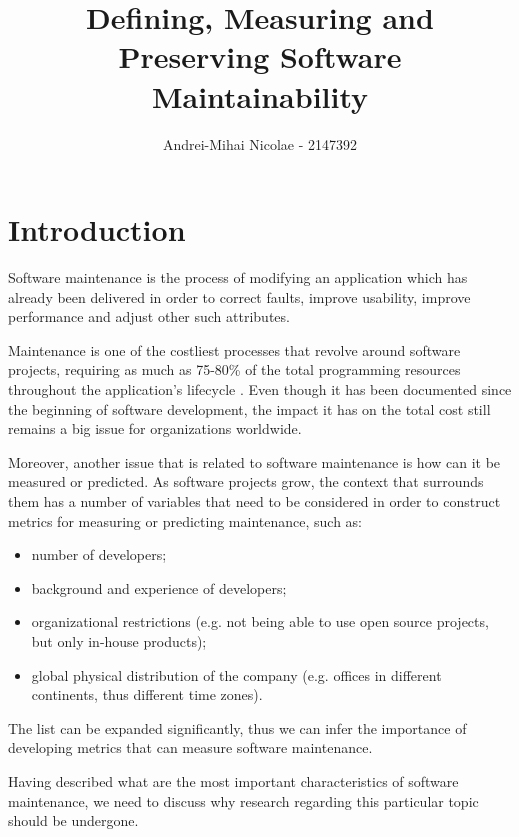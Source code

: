 \documentclass[a4paper,portrait,12pt]{article}
\author{Andrei-Mihai Nicolae - 2147392}
\title{Defining, Measuring and Preserving Software Maintainability }
\begin{document}
\setlength{\oddsidemargin}{0.9847in-1in}
\setlength{\textwidth}{\paperwidth - 0.9847in-0.9847in}
  
\maketitle

 \section{Introduction}
  
  Software maintenance is the process of modifying an application which has
  already been delivered in order to correct faults, improve usability,
  improve performance and adjust other such attributes\citep{iee1990ieee}. 
 
  Maintenance is one of the costliest processes that revolve around 
  software projects, requiring as much as 75-80\% of the total programming 
  resources throughout the application's lifecycle
  \citep{lientz1978characteristics}. Even though it has been documented 
  since the beginning of software development, the impact it has on the
  total cost still remains a big issue for organizations worldwide. 

  Moreover, another issue that is related to software maintenance is how 
  can it be measured or predicted. As software projects grow, the context that 
  surrounds them has a number of variables that need to be considered in order 
  to construct metrics for measuring or predicting maintenance, such as:
    \begin{itemize}
      \item number of developers;
      \item background and experience of developers;
      \item organizational restrictions (e.g. not being able to use open 
      source projects, but only in-house products);
      \item global physical distribution of the company (e.g. offices in
      different continents, thus different time zones).
    \end{itemize}
  The list can be expanded significantly, thus we can infer the importance 
  of developing metrics that can measure software maintenance.

  Having described what are the most important characteristics of software
  maintenance, we need to discuss why research regarding this particular
  topic should be undergone. 
 
\end{document}
